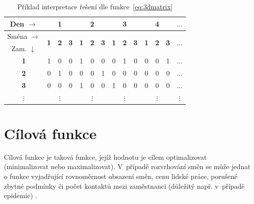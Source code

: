 \documentclass[a4paper,11pt,openany,twoside]{book}
\begin{document}
\begin{table}[h]
	\centering
	\begin{tabular}{c| ccc | ccc | ccc | ccc | c }
	  \hline
	  Den $\rightarrow$  & \multicolumn{3}{c|}{\textbf{1}} & \multicolumn{3}{c|}{\textbf{2}} & \multicolumn{3}{c|}{\textbf{3}} & \multicolumn{3}{c|}{\textbf{4}}  & $\hdots$ \\
	  \hline

	  {Směna $\rightarrow$}                 & \multirow{2}{*}{\textbf{1}} & \multirow{2}{*}{\textbf{2}} & \multirow{2}{*}{\textbf{3}}        & \multirow{2}{*}{\textbf{1}} & \multirow{2}{*}{\textbf{2}} & \multirow{2}{*}{\textbf{3}}             & \multirow{2}{*}{\textbf{1}} & \multirow{2}{*}{\textbf{2}} & \multirow{2}{*}{\textbf{3}}              & \multirow{2}{*}{\textbf{1}} & \multirow{2}{*}{\textbf{2}} & \multirow{2}{*}{\textbf{3}} & \multirow{2}{*}{$\hdots$} \\

	  {Zam. $\downarrow$} & &&&&&&&&&&&& \\
	  \hline

	  \rowcolor{Gray}
	  \textbf{1}                                   & 1 & 0 & 0               & 1 & 0 & 0             & 0 & 1 & 0              & 0 & 0 & 1 & $\hdots$ \\

	  \textbf{2}                                   & 0 & 1 & 0               & 0 & 0 & 1             & 0 & 0 & 0              & 0 & 0 & 0 & $\hdots$ \\
	  \rowcolor{Gray}
	  \textbf{3}                                   & 0 & 0 & 0               & 1 & 0 & 0             & 1 & 0 & 0              & 0 & 0 & 0 & $\hdots$ \\

	  $\vdots$                            & \multicolumn{3}{c|}{$\vdots$} & \multicolumn{3}{c|}{$\vdots$} & \multicolumn{3}{c|}{$\vdots$} & \multicolumn{3}{c|}{$\vdots$} & $\vdots$ \\
	\end{tabular}
	\caption{Příklad interpretace řešení dle funkce~\ref{eq:3dmatrix}}
	\label{tab:interpretation}
\end{table}

\section{Cílová funkce}
\label{sec:objective}
Cílová funkce je taková funkce, jejíž hodnotu je cílem optimalizovat (minimalizovat nebo maximalizovat). V~případě rozvrhování směn se může jednat o funkce vyjadřující rovnoměrnost obsazení směn, cenu lidské práce, porušené zbytné podmínky \cite{blochliger2004modeling} či počet kontaktů mezi zaměstnanci (důležitý např. v~případě epidemie) \cite{zucchi2020personnel}.
\end{document}
